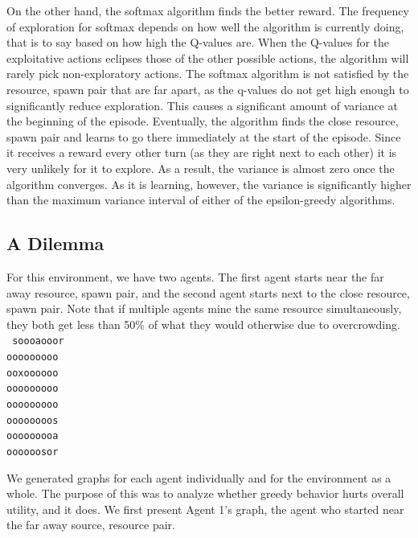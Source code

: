 \documentclass[11pt]{article}
\begin{document}
On the other hand, the softmax algorithm finds the better reward. The frequency of exploration for softmax depends on how well the algorithm is currently doing, that is to say based on how high the Q-values are. When the Q-values for the exploitative actions eclipses those of the other possible actions, the algorithm will rarely pick non-exploratory actions. The softmax algorithm is not satisfied by the resource, spawn pair that are far apart, as the q-values do not get high enough to significantly reduce exploration. This causes a significant amount of variance at the beginning of the episode. Eventually, the algorithm finds the close resource, spawn pair and learns to go there immediately at the start of the episode. Since it receives a reward every other turn (as they are right next to each other) it is very unlikely for it to explore. As a result, the variance is almost zero once the algorithm converges. As it is learning, however, the variance is significantly higher than the maximum variance interval of either of the epsilon-greedy algorithms.

\subsection{A Dilemma}

For this environment, we have two agents. The first agent starts near the far away resource, spawn pair, and the second agent starts next to the close resource, spawn pair. Note that if multiple agents mine the same resource simultaneously, they both get less than 50\% of what they would otherwise due to overcrowding.\\
\texttt{
soooaooor\\
ooooooooo\\
ooxoooooo\\
ooooooooo\\
ooooooooo\\
oooooooos\\
ooooooooa\\
oooooosor\\
}

We generated graphs for each agent individually and for the environment as a whole. The purpose of this was to analyze whether greedy behavior hurts overall utility, and it does. We first present Agent 1's graph, the agent who started near the far away source, resource pair.

\end{document}
